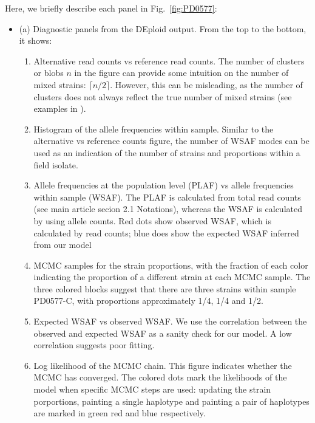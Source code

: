 \documentclass{article}
\begin{document}
Here, we briefly describe each panel in Fig.~\ref{fig:PD0577}:
\begin{itemize}
\item (a) Diagnostic panels from the DEploid output. From the top to the bottom, it shows:
\begin{enumerate}
\item Alternative read counts vs reference read counts. The number of clusters or blobs $n$ in the figure can provide some intuition on the number of mixed strains: $\lceil n/2\rceil$. However, this can be misleading, as the number of clusters does not always reflect the true number of mixed strains (see examples in \citet{Zhu2017}).

\item Histogram of the allele frequencies within sample. Similar to the alternative vs reference counts figure, the number of WSAF modes can be used as an indication of the number of strains and proportions within a field isolate.

\item Allele frequencies at the population level (PLAF) vs allele frequencies within sample (WSAF). The PLAF is calculated from total read counts (see main article secion 2.1 Notations), whereas the WSAF is calculated by using allele counts. Red dots show observed WSAF, which is calculated by read counts; blue does show the expected WSAF inferred from our model

\item MCMC samples for the strain proportions, with the fraction of each color indicating the proportion of a different strain at each MCMC sample. The three colored blocks suggest that there are three strains within sample {\textmd PD0577-C}, with proportions approximately 1/4, 1/4 and 1/2.

\item Expected WSAF vs observed WSAF. We use the correlation between the observed and expected WSAF as a sanity check for our model. A low correlation suggests poor fitting.

\item Log likelihood of the MCMC chain. This figure indicates whether the MCMC has converged. The colored dots mark the likelihoods of the model when specific MCMC steps are used: updating the strain porportions, painting a single haplotype and painting a pair of haplotypes are marked in green red and blue respectively.
\end{enumerate}


\end{itemize}
\end{document}
